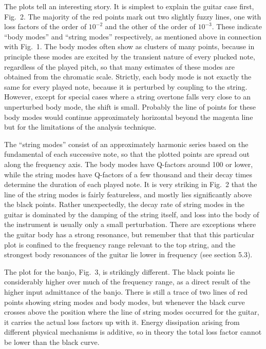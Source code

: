   The plots tell an interesting story. It is simplest to explain the guitar 
  case first, Fig.\ 2. The majority of the red points mark out two slightly 
  fuzzy lines, one with loss factors of the order of $10^{-2}$ and the other of 
  the order of $10^{-3}$. These indicate ``body modes'' and ``string modes'' 
  respectively, as mentioned above in connection with Fig.\ 1. The body modes 
  often show as clusters of many points, because in principle these modes are 
  excited by the transient nature of every plucked note, regardless of the 
  played pitch, so that many estimates of these modes are obtained from the 
  chromatic scale. Strictly, each body mode is not exactly the same for every 
  played note, because it is perturbed by coupling to the string. However, 
  except for special cases where a string overtone falls very close to an 
  unperturbed body mode, the shift is small. Probably the line of points for 
  these body modes would continue approximately horizontal beyond the magenta 
  line but for the limitations of the analysis technique. 

  The ``string modes'' consist of an approximately harmonic series based on the 
  fundamental of each successive note, so that the plotted points are spread 
  out along the frequency axis. The body modes have Q-factors around 100 or 
  lower, while the string modes have Q-factors of a few thousand and their 
  decay times determine the duration of each played note. It is very striking 
  in Fig.\ 2 that the line of the string modes is fairly featureless, and 
  mostly lies significantly above the black points. Rather unexpectedly, the 
  decay rate of string modes in the guitar is dominated by the damping of the 
  string itself, and loss into the body of the instrument is usually only a 
  small perturbation. There are exceptions where the guitar body has a strong 
  resonance, but remember that that this particular plot is confined to the 
  frequency range relevant to the top string, and the strongest body resonances 
  of the guitar lie lower in frequency (see section 5.3). 

  The plot for the banjo, Fig.\ 3, is strikingly different. The black points 
  lie considerably higher over much of the frequency range, as a direct result 
  of the higher input admittance of the banjo. There is still a trace of two 
  lines of red points showing string modes and body modes, but whenever the 
  black curve crosses above the position where the line of string modes 
  occurred for the guitar, it carries the actual loss factors up with it. 
  Energy dissipation arising from different physical mechanisms is additive, so 
  in theory the total loss factor cannot be lower than the black curve. 


